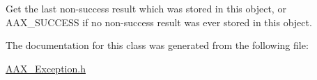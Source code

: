 Get the last non-\/success result which was stored in this object, or A\+A\+X\+\_\+\+S\+U\+C\+C\+E\+S\+S if no non-\/success result was ever stored in this object. 



The documentation for this class was generated from the following file\+:\begin{DoxyCompactItemize}
\item 
\hyperlink{a00208}{A\+A\+X\+\_\+\+Exception.\+h}\end{DoxyCompactItemize}
